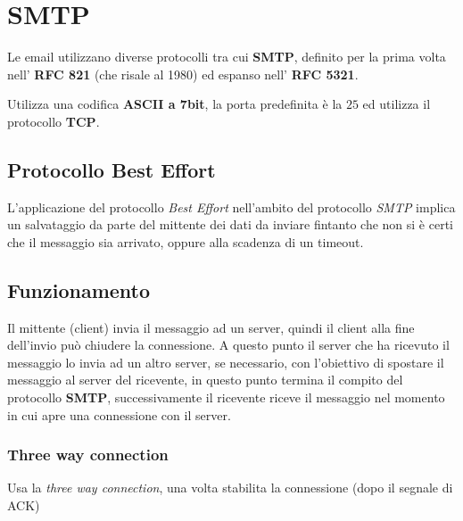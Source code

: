 \section{SMTP}
Le email utilizzano diverse protocolli tra cui \textbf{SMTP}, definito per la
prima volta nell' \textbf{RFC 821} (che risale al 1980) ed espanso nell'
\textbf{RFC 5321}.

Utilizza una codifica \textbf{ASCII a 7bit}, la porta predefinita è la $25$ ed
utilizza il protocollo \textbf{TCP}.

\subsection{Protocollo Best Effort}
L'applicazione del protocollo \textit{Best Effort} nell'ambito del protocollo
\emph{SMTP} implica un salvataggio da parte del mittente dei dati da inviare
fintanto che non si è certi che il messaggio sia arrivato, oppure alla
scadenza di un timeout.

\subsection{Funzionamento}
Il mittente (client) invia il messaggio ad un server, quindi il client alla
fine dell'invio può chiudere la connessione.
A questo punto il server che ha ricevuto il messaggio lo invia ad un altro
server, se necessario, con l'obiettivo di spostare il messaggio al server
del ricevente, in questo punto termina il compito del protocollo \textbf{SMTP},
successivamente il ricevente riceve il messaggio nel momento
in cui apre una connessione con il server.

\subsubsection{Three way connection}
Usa la \emph{three way connection}, una volta stabilita la connessione (dopo il
segnale di ACK)

